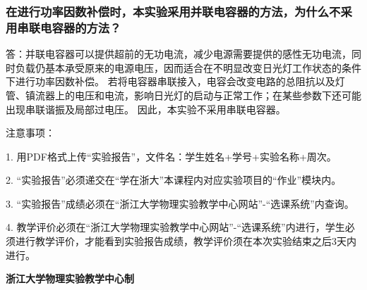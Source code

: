 \documentclass[10pt,a4paper]{ctexart} %
\begin{document}
    \subsubsection{在进行功率因数补偿时，本实验采用并联电容器的方法，为什么不采用串联电容器的方法？}
    答：并联电容器可以提供超前的无功电流，减少电源需要提供的感性无功电流，同时负载仍基本承受原来的电源电压，因而适合在不明显改变日光灯工作状态的条件下进行功率因数补偿。
    若将电容器串联接入，电容会改变电路的总阻抗以及灯管、镇流器上的电压和电流，影响日光灯的启动与正常工作；在某些参数下还可能出现串联谐振及局部过电压。
    因此，本实验不采用串联电容器。

\vspace*{\fill} %
\noindent
\begin{minipage}{\textwidth}
  注意事项：

  \begingroup
    \setlength{\leftskip}{2em} %
    1. 用PDF格式上传“实验报告”，文件名：学生姓名+学号+实验名称+周次。

    2. “实验报告”必须递交在“学在浙大”本课程内对应实验项目的“作业”模块内。

    3. “实验报告”成绩必须在“浙江大学物理实验教学中心网站”-“选课系统”内查询。

    4. 教学评价必须在“浙江大学物理实验教学中心网站”-“选课系统”内进行，学生必须进行教学评价，才能看到实验报告成绩，教学评价须在本次实验结束之后3天内进行。\par
  \endgroup

  \begin{center}
    {\bfseries 浙江大学物理实验教学中心制}
  \end{center}
\end{minipage}
\end{document}
